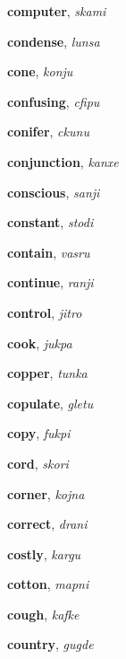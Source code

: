\documentclass[12pt]{book}
\begin{document}
\begin{description}
\item[ ] \textbf{computer}, \textit{skami}

\item[ ] \textbf{condense}, \textit{lunsa}

\item[ ] \textbf{cone}, \textit{konju}

\item[ ] \textbf{confusing}, \textit{cfipu}

\item[ ] \textbf{conifer}, \textit{ckunu}

\item[ ] \textbf{conjunction}, \textit{kanxe}

\item[ ] \textbf{conscious}, \textit{sanji}

\item[ ] \textbf{constant}, \textit{stodi}

\item[ ] \textbf{contain}, \textit{vasru}

\item[ ] \textbf{continue}, \textit{ranji}

\item[ ] \textbf{control}, \textit{jitro} 

\item[ ] \textbf{cook}, \textit{jukpa}

\item[ ] \textbf{copper}, \textit{tunka}

\item[ ] \textbf{copulate}, \textit{gletu}

\item[ ] \textbf{copy}, \textit{fukpi}

\item[ ] \textbf{cord}, \textit{skori}

\item[ ] \textbf{corner}, \textit{kojna}

\item[ ] \textbf{correct}, \textit{drani}

\item[ ] \textbf{costly}, \textit{kargu}

\item[ ] \textbf{cotton}, \textit{mapni}

\item[ ] \textbf{cough}, \textit{kafke}

\item[ ] \textbf{country}, \textit{gugde}


\end{description}
\end{document}
